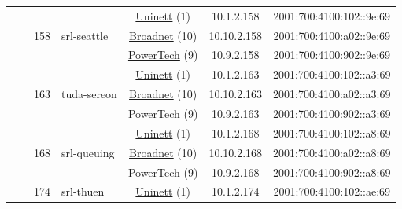 \begin{small}
\begin{center}
\begin{longtable}{|c|c|c|c|c|c|c|c|}
  &  & \multirow{3}{*}{\tiny{158}} & \multicolumn{1}{|l|}{\multirow{3}{*}{\tiny{srl-seattle}}} & \multicolumn{2}{|c|}{\tiny{\href{https://www.uninett.no}{Uninett} (1)}} & \tiny{10.1.2.158} & \tiny{2001:700:4100:102::9e:69} \\* \cline{5-5}\cline{6-6}\cline{7-7}\cline{8-8}
  &  &  &  & \multicolumn{2}{|c|}{\tiny{\href{https://www.broadnet.no}{Broadnet} (10)}} & \tiny{10.10.2.158} & \tiny{2001:700:4100:a02::9e:69} \\* \cline{5-5}\cline{6-6}\cline{7-7}\cline{8-8}
  &  &  &  & \multicolumn{2}{|c|}{\tiny{\href{http://www.powertech.no}{PowerTech} (9)}} & \tiny{10.9.2.158} & \tiny{2001:700:4100:902::9e:69} \\* \cline{3-3}\cline{4-4}\cline{5-5}\cline{6-6}\cline{7-7}\cline{8-8}
  &  & \multirow{3}{*}{\tiny{163}} & \multicolumn{1}{|l|}{\multirow{3}{*}{\tiny{tuda-sereon}}} & \multicolumn{2}{|c|}{\tiny{\href{https://www.uninett.no}{Uninett} (1)}} & \tiny{10.1.2.163} & \tiny{2001:700:4100:102::a3:69} \\* \cline{5-5}\cline{6-6}\cline{7-7}\cline{8-8}
  &  &  &  & \multicolumn{2}{|c|}{\tiny{\href{https://www.broadnet.no}{Broadnet} (10)}} & \tiny{10.10.2.163} & \tiny{2001:700:4100:a02::a3:69} \\* \cline{5-5}\cline{6-6}\cline{7-7}\cline{8-8}
  &  &  &  & \multicolumn{2}{|c|}{\tiny{\href{http://www.powertech.no}{PowerTech} (9)}} & \tiny{10.9.2.163} & \tiny{2001:700:4100:902::a3:69} \\* \cline{3-3}\cline{4-4}\cline{5-5}\cline{6-6}\cline{7-7}\cline{8-8}
  &  & \multirow{3}{*}{\tiny{168}} & \multicolumn{1}{|l|}{\multirow{3}{*}{\tiny{srl-queuing}}} & \multicolumn{2}{|c|}{\tiny{\href{https://www.uninett.no}{Uninett} (1)}} & \tiny{10.1.2.168} & \tiny{2001:700:4100:102::a8:69} \\* \cline{5-5}\cline{6-6}\cline{7-7}\cline{8-8}
  &  &  &  & \multicolumn{2}{|c|}{\tiny{\href{https://www.broadnet.no}{Broadnet} (10)}} & \tiny{10.10.2.168} & \tiny{2001:700:4100:a02::a8:69} \\* \cline{5-5}\cline{6-6}\cline{7-7}\cline{8-8}
  &  &  &  & \multicolumn{2}{|c|}{\tiny{\href{http://www.powertech.no}{PowerTech} (9)}} & \tiny{10.9.2.168} & \tiny{2001:700:4100:902::a8:69} \\* \cline{3-3}\cline{4-4}\cline{5-5}\cline{6-6}\cline{7-7}\cline{8-8}
  &  & \multirow{3}{*}{\tiny{174}} & \multicolumn{1}{|l|}{\multirow{3}{*}{\tiny{srl-thuen}}} & \multicolumn{2}{|c|}{\tiny{\href{https://www.uninett.no}{Uninett} (1)}} & \tiny{10.1.2.174} & \tiny{2001:700:4100:102::ae:69} \\* \cline{5-5}\cline{6-6}\cline{7-7}\cline{8-8}

\end{longtable}
\end{center}
\end{small}
